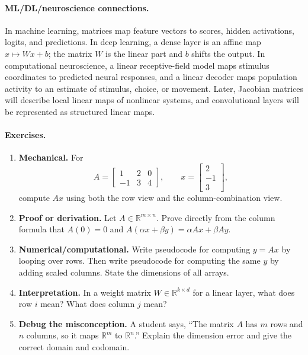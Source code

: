 \paragraph{ML/DL/neuroscience connections.}
In machine learning, matrices map feature vectors to scores, hidden activations, logits, and predictions. In deep learning, a dense layer is an affine map \(x\mapsto Wx+b\); the matrix \(W\) is the linear part and \(b\) shifts the output. In computational neuroscience, a linear receptive-field model maps stimulus coordinates to predicted neural responses, and a linear decoder maps population activity to an estimate of stimulus, choice, or movement. Later, Jacobian matrices will describe local linear maps of nonlinear systems, and convolutional layers will be represented as structured linear maps.

\paragraph{Exercises.}
\begin{enumerate}[label=\textbf{4.1.\arabic*.}, leftmargin=*]
\item \textbf{Mechanical.} For
\[
A=\begin{bmatrix}1&2&0\\ -1&3&4\end{bmatrix},
\qquad
x=\begin{bmatrix}2\\-1\\3\end{bmatrix},
\]
compute \(Ax\) using both the row view and the column-combination view.
\item \textbf{Proof or derivation.} Let \(A\in\mathbb{R}^{m\times n}\). Prove directly from the column formula that \(A(0)=0\) and \(A(\alpha x+\beta y)=\alpha Ax+\beta Ay\).
\item \textbf{Numerical/computational.} Write pseudocode for computing \(y=Ax\) by looping over rows. Then write pseudocode for computing the same \(y\) by adding scaled columns. State the dimensions of all arrays.
\item \textbf{Interpretation.} In a weight matrix \(W\in\mathbb{R}^{k\times d}\) for a linear layer, what does row \(i\) mean? What does column \(j\) mean?
\item \textbf{Debug the misconception.} A student says, ``The matrix \(A\) has \(m\) rows and \(n\) columns, so it maps \(\mathbb{R}^m\) to \(\mathbb{R}^n\).'' Explain the dimension error and give the correct domain and codomain.
\end{enumerate}

